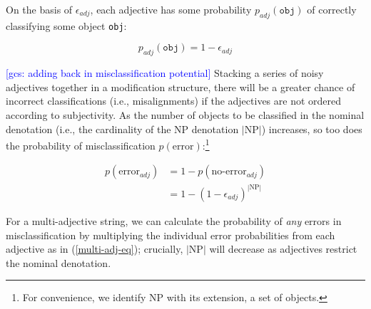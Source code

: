 \documentclass[preprint,authoryear]{elsarticle}\frenchspacing
\newcommand{\gcs}[1]{\textcolor{blue}{[gcs: #1]}}
\begin{document}
%
%
%
On the basis of $\epsilon_{adj}$, each adjective has some probability $p_{adj}(\texttt{obj})$ of correctly classifying some object \texttt{obj}: 

\setcounter{equation}{2}
\begin{equation}
p_{adj}(\texttt{obj}) = 1-\epsilon_{adj}
\end{equation}

\noindent
\gcs{adding back in misclassification potential}
Stacking a series of noisy adjectives together in a modification structure, there will be a greater chance of incorrect classifications (i.e., misalignments) if the adjectives are not ordered according to subjectivity. %
As the number of objects to be classified in the nominal denotation (i.e., the cardinality of the NP denotation $|\textrm{NP}|$) increases, so too does the probability of misclassification $p(\textrm{error})$:\footnote{For convenience, we identify NP with its extension, a set of objects.} 
	
\setcounter{equation}{3}
\begin{align}
p(\textrm{error}_{adj}) &= 1 - p(\textrm{no-error}_{adj}) \nonumber\\
&= 1 - (1-\epsilon_{adj})^{|\textrm{NP}|}
\end{align}
	
For a multi-adjective string, we can calculate the probability of \emph{any} errors in misclassification by multiplying the individual error probabilities from each adjective as in (\ref{multi-adj-eq}); crucially, $|\textrm{NP}|$ will decrease as adjectives restrict the nominal denotation. 
	
\end{document}
